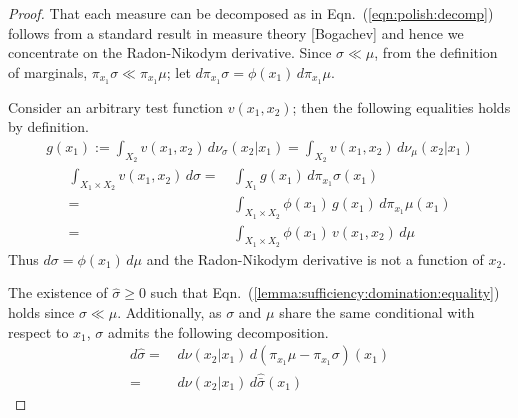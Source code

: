 \documentclass[dvipsnames]{article}
\begin{document}
\begin{proof}
  That each measure can be decomposed as in Eqn.~(\ref{eqn:polish:decomp}) follows from a standard result in measure theory [Bogachev] and hence we concentrate on the Radon-Nikodym derivative. Since $\sigma\ll \mu$, from the definition of marginals, $\pi_{x_1}\sigma\ll \pi_{x_1}\mu$; let $d\pi_{x_1}\sigma=\phi(x_1)\,d\pi_{x_1}\mu$.\par
  Consider an arbitrary test function $v(x_1,x_2)$; then the following equalities holds by definition.
  \begin{align*}
    g(x_1):=\int_{X_2}v(x_1,x_2)\,d\nu_{\sigma}(x_2|x_1)=\int_{X_2}v(x_1,x_2)\,d\nu_{\mu}(x_2|x_1)
  \end{align*}
  \begin{align*}
    \int_{X_1\times X_2} v(x_1,x_2)\,d\sigma=&\,\int_{X_1}g(x_1)\,d\pi_{x_1}\sigma(x_1)\\
    =&\,\int_{X_1\times X_2}\phi(x_1)\,g(x_1)\,d\pi_{x_1}\mu(x_1)\\
    =&\,\int_{X_1\times X_2} \phi(x_1)\,v(x_1,x_2)\,d\mu
  \end{align*}
  Thus $d\sigma=\phi(x_1)\,d\mu$ and the Radon-Nikodym derivative is not a function of $x_2$.
  \par
  The existence of $\hat\sigma \ge 0$ such that Eqn.~(\ref{lemma:sufficiency:domination:equality}) holds since $\sigma\ll\mu$. Additionally, as $\sigma$ and $\mu$ share the same conditional with respect to $x_1$, $\sigma$ admits the following decomposition.
  \begin{align*}
    d\hat \sigma=&\,d\nu(x_2|x_1)\,d(\pi_{x_1}\mu-\pi_{x_1}\sigma)(x_1)\\
    =&\,d\nu(x_2|x_1)\,d\hat{\bar\sigma}(x_1)
  \end{align*}
\end{proof}

\end{document}
